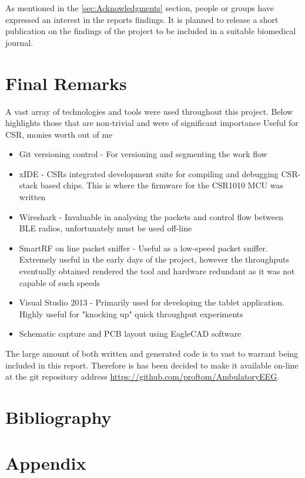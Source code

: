 \documentclass[]{article}
\begin{document}
As mentioned in the \ref{sec:Acknowledgments} section, people or groups have expressed an interest in the reports findings. It is planned to release a short publication on the findings of the project to be included in a suitable biomedical journal. 



\section{Final Remarks}
A vast array of technologies and tools were used throughout this project. Below highlights those that are non-trivial and were of significant importance
Useful for CSR, monies worth out of me

\begin{itemize}
	\item Git versioning control - For versioning and segmenting the work flow
	\item xIDE - CSRs integrated development suite for compiling and debugging CSR-stack based chips. This is where the firmware for the CSR1010 MCU was written
	\item Wireshark - Invaluable in analysing the packets and control flow between BLE radios, unfortunately must be used off-line
	\item SmartRF on line packet sniffer - Useful as a low-speed packet sniffer. Extremely useful in the early days of the project, however the throughputs eventually obtained rendered the tool and hardware redundant as it was not capable of such speeds
	\item Visual Studio 2013 - Primarily used for developing the tablet application. Highly useful for "knocking up" quick throughput experiments 
	\item Schematic capture and \ac{PCB} layout using EagleCAD software
\end{itemize}

The large amount of both written and generated code is to vast to warrant being included in this report. Therefore is has been decided to make it available on-line at the git repository address 
\url{https://github.com/proftom/AmbulatoryEEG}.
\clearpage
\section{Bibliography}

\nocite{*}

\printbibliography

\section{Appendix}
\end{document}
